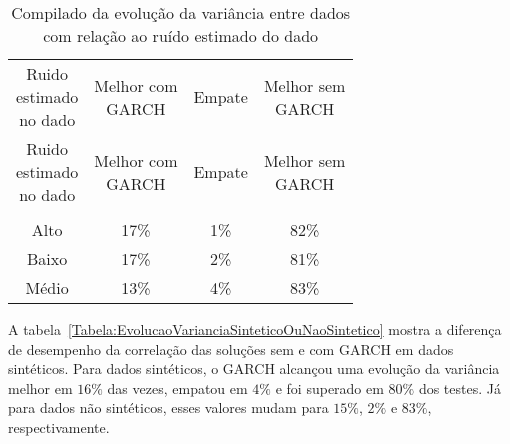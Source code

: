  \begin{center}
\begin{longtable}{cccc}
\toprule
\rowcolor{white}
 \caption{Compilado da evolução da variância entre dados com relação ao ruído
 estimado do dado}\label{Tabela:EvolucaoVarianciaRuidoEstimado} \\
\midrule
\rowcolor{white}
   \specialcell{Ruido\\estimado\\no dado} & \specialcell{Melhor com\\GARCH} &
   Empate & \specialcell{Melhor sem\\GARCH} \\
\midrule
\endfirsthead
\midrule
\rowcolor{white}
   \specialcell{Ruido\\estimado\\no dado} & \specialcell{Melhor com\\GARCH} &
   Empate & \specialcell{Melhor sem\\GARCH} \\
\toprule
\endhead
\midrule \\ %
\endfoot
\bottomrule
\endlastfoot
    Alto  & 17\%  & 1\%   & 82\% \\
    Baixo & 17\%  & 2\%   & 81\% \\
    Médio & 13\%  & 4\%   & 83\% \\
\end{longtable}
\end{center}

A tabela~\ref{Tabela:EvolucaoVarianciaSinteticoOuNaoSintetico} mostra a
diferença de desempenho da correlação das soluções sem e com GARCH em dados
sintéticos. Para dados sintéticos, o GARCH alcançou uma evolução da variância
 melhor em $16\%$ das vezes, empatou em $4\%$ e foi superado em $80\%$
dos testes. Já para dados não sintéticos, esses valores mudam para $15\%$, $2\%$
e $83\%$, respectivamente.

